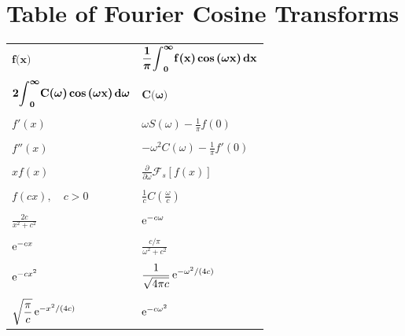 








\pagebreak
\section{Table of Fourier Cosine Transforms}

\setlongtables
\begin{longtable}{ll}
  $\displaystyle \mathbf{f \boldsymbol{(} x \boldsymbol{)}}$
  & $\displaystyle \mathbf{\frac{1}{\boldsymbol{\pi}} \boldsymbol{\int}_0^{\boldsymbol{\infty}} f \boldsymbol{(} x\boldsymbol{)} 
    \mathop{\mathbf{cos}}\nolimits \boldsymbol{(} \boldsymbol{\omega} x \boldsymbol{)} \,d x}$ \\
  \\
  $\displaystyle \mathbf{2 \boldsymbol{\int}_0^{\boldsymbol{\infty}} C \boldsymbol{(} \boldsymbol{\omega}\boldsymbol{)}
    \mathop{\mathbf{cos}}\nolimits\boldsymbol{(} \boldsymbol{\omega} x \boldsymbol{)} \,d \boldsymbol{\omega}}$
  & $\displaystyle \mathbf{C \boldsymbol{(} \boldsymbol{\omega} \boldsymbol{)} }$ \\
  \\
  $\displaystyle f'(x)$
  & $\displaystyle \omega S(\omega) - \frac{1}{\pi} f(0)$ \\
  \\
  $\displaystyle f''(x)$
  & $\displaystyle -\omega^2 C(\omega) - \frac{1}{\pi} f'(0)$ \\
  \\
  $\displaystyle x f(x)$
  & $\displaystyle \frac{\partial}{\partial \omega} \mathcal{F}_s [f(x)]$ \\
  \\
  $\displaystyle f(c x), \quad c > 0$
  & $\displaystyle \frac{1}{c} C\left(\frac{\omega}{c}\right)$ \\
  \\
  $\displaystyle \frac{2 c}{x^2 + c^2}$
  & $\displaystyle \mathop{\mathrm{e}}\nolimits^{- c \omega}$ \\
  \\
  $\displaystyle \mathop{\mathrm{e}}\nolimits^{-c x}$
  & $\displaystyle \frac{c / \pi}{\omega^2 + c^2}$ \\
  \\
  $\displaystyle \mathop{\mathrm{e}}\nolimits^{- c x^2}$
  & $\displaystyle \frac{1}{\sqrt{4 \pi c}} \mathop{\mathrm{e}}\nolimits^{-\omega^2/(4 c)}$ \\
  \\
  $\displaystyle \sqrt{ \frac{\pi}{c} } \mathop{\mathrm{e}}\nolimits^{-x^2/(4 c)}$
  & $\displaystyle \mathop{\mathrm{e}}\nolimits^{- c \omega^2}$
\end{longtable}
